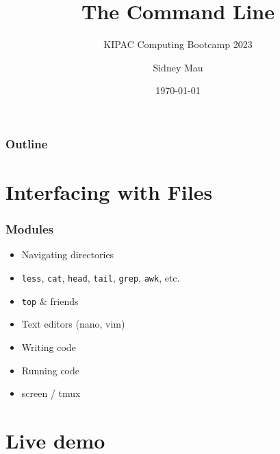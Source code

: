 \documentclass[aspectratio=169]{beamer}
\title{The Command Line}
\subtitle{KIPAC Computing Bootcamp 2023}
\author[S. Mau]{Sidney Mau}
\institute[Stanford]{Stanford University}
\date[\today]{\today}
\begin{document}

\frame{\titlepage}

\begin{frame}
	\frametitle{Outline}
	\tableofcontents
\end{frame}


\section{Interfacing with Files}

\frame{\sectionpage}


\begin{frame}[t]
	\frametitle{Modules}
	\begin{itemize}
		\item Navigating directories
		\item \texttt{less}, \texttt{cat}, \texttt{head}, \texttt{tail}, \texttt{grep}, \texttt{awk}, etc.
		\item \texttt{top} \& friends
		\item Text editors (nano, vim)
		\item Writing code
		\item Running code
		\item screen / tmux
	\end{itemize}
\end{frame}


\section{Live demo}

\frame{\sectionpage}
\end{document}
